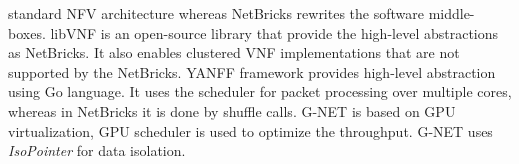 \documentclass[12pt,twoside,doublepage]{article}
\begin{document}
standard NFV architecture whereas NetBricks  rewrites the software middle-boxes. libVNF\cite{Naik2017} is an open-source library that provide the high-level abstractions as NetBricks. It also enables clustered VNF implementations that are not supported by the NetBricks. YANFF\cite{Philippov2017} framework provides high-level abstraction using Go language. It uses the scheduler for packet processing over multiple cores, whereas in NetBricks it is done by shuffle calls. G-NET\cite{Zhang2018} is based on GPU virtualization, GPU scheduler is used to optimize the throughput. G-NET uses \textit{IsoPointer} for data isolation.
\nocite{*}









\end{document}
